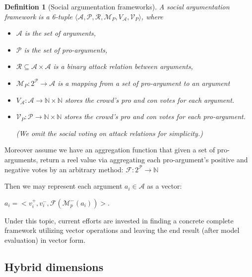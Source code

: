 \documentclass{article}
\newtheorem{definition}{Definition}
\newcommand{\nat}{\mathbb{N}}   %
\newcommand{\args}{\mathcal{A}} %
\newcommand{\att}{\mathcal{R}}  %
\newcommand{\varg}{V_{\args}}   %
\newcommand{\vatt}{V_{\att}}   %
\begin{document}
\begin{definition}[Social argumentation frameworks]
A social argumentation framework is a 6-tuple $\langle \args, \mathcal{P}, \att, \mathcal{M}_P,  \varg, \mathcal{V}_P \rangle$, where
\begin{itemize}
  \item $\mathcal{A}$ is the set of arguments,
  \item  $\mathcal{P}$ is the set of pro-arguments,
  \item $\att \subseteq \args \times \args$ is a binary attack relation between arguments,
 \item $\mathcal{M}_P: 2^{\mathcal{P}} \to \args$ is a mapping from a set of pro-argument to an argument
  \item $\varg : \args \to \nat \times \nat$ stores the crowd's pro and con votes for each argument.
\item $\mathcal{V}_P : \mathcal{P} \to \nat \times \nat$ stores the crowd's pro and con votes for each pro-argument.

(We omit the social voting on attack relations for simplicity.)
\end{itemize}
\end{definition}

Moreover assume we have an aggregation function that given a set of pro-arguments, return a reel value via aggregating each pro-argument's positive and negative votes by an arbitrary method:  $\mathcal{F}: 2^{\mathcal{P}} \to \nat$

Then we may represent each argument $a_i \in \args$ as a vector:

 $a_i = < v_{i}^+,  v_{i}^-, \mathcal{F}(\mathcal{M}_{p}^{-}(a_{i}))>$.


Under this topic, current efforts are invested in finding a concrete complete framework utilizing vector operations and leaving the end result (after model evaluation) in vector form.



\subsection{Hybrid dimensions}
\end{document}
